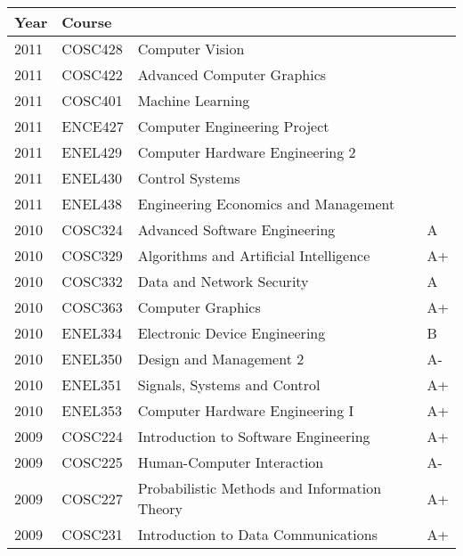 \documentclass[10pt,a4]{article}
\begin{document}
\begin{parcolumns}[colwidths={1=0.3\textwidth},nofirstindent]{2}
{      \color{dark}
      \footnotesize
      \begin{tabularx}{0.7\textwidth}{llXl}
        \hline
        \textbf{Year} & \textbf{Course} & & \\
        \hline
        2011 & COSC428 & Computer Vision                                    &      \\
        2011 & COSC422 & Advanced Computer Graphics                         &      \\
        2011 & COSC401 & Machine Learning                                   &      \\
        2011 & ENCE427 & Computer Engineering Project                       &      \\
        2011 & ENEL429 & Computer Hardware Engineering 2                    &      \\
        2011 & ENEL430 & Control Systems                                    &      \\
        2011 & ENEL438 & Engineering Economics and Management               &      \\
        2010 & COSC324 & Advanced Software Engineering                      & A    \\
        2010 & COSC329 & Algorithms and Artificial Intelligence             & A+   \\
        2010 & COSC332 & Data and Network Security                          & A    \\
        2010 & COSC363 & Computer Graphics                                  & A+   \\
        2010 & ENEL334 & Electronic Device Engineering                      & B    \\
        2010 & ENEL350 & Design and Management 2                            & A-   \\
        2010 & ENEL351 & Signals, Systems and Control                       & A+   \\
        2010 & ENEL353 & Computer Hardware Engineering I                    & A+   \\
        2009 & COSC224 & Introduction to Software Engineering               & A+   \\
        2009 & COSC225 & Human-Computer Interaction                         & A-   \\
        2009 & COSC227 & Probabilistic Methods and Information Theory       & A+   \\
        2009 & COSC231 & Introduction to Data Communications                & A+   \\

\end{tabularx}}
\end{parcolumns}
\end{document}
